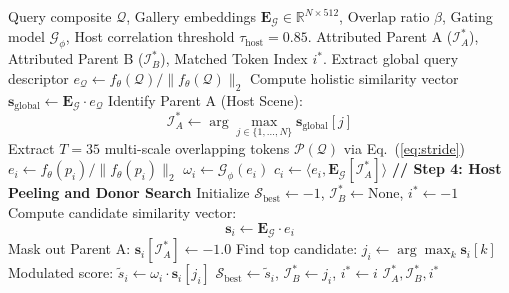 \documentclass[journal]{IEEEtran}
\begin{document}
\begin{algorithm}[t]
\caption{MOTA Multi-Source Lineage Attribution Algorithm}
\label{alg:mota}
\begin{algorithmic}[1]
\REQUIRE Query composite $\mathcal{Q}$, Gallery embeddings $\mathbf{E}_{\mathcal{G}} \in \mathbb{R}^{N \times 512}$, Overlap ratio $\beta$, Gating model $\mathcal{G}_\phi$, Host correlation threshold $\tau_{\text{host}} = 0.85$.
\ENSURE Attributed Parent A ($\mathcal{I}_A^*$), Attributed Parent B ($\mathcal{I}_B^*$), Matched Token Index $i^*$.
\STATE Extract global query descriptor $e_{\mathcal{Q}} \leftarrow f_\theta(\mathcal{Q}) / \|f_\theta(\mathcal{Q})\|_2$
\STATE Compute holistic similarity vector $\mathbf{s}_{\text{global}} \leftarrow \mathbf{E}_{\mathcal{G}} \cdot e_{\mathcal{Q}}$
\STATE Identify Parent A (Host Scene): 
$$\mathcal{I}_A^* \leftarrow \arg\max_{j \in \{1, \dots, N\}} \mathbf{s}_{\text{global}}[j]$$
\STATE Extract $T=35$ multi-scale overlapping tokens $\mathcal{P}(\mathcal{Q})$ via Eq.~(\ref{eq:stride})
    \STATE $e_i \leftarrow f_\theta(p_i) / \|f_\theta(p_i)\|_2$
    \STATE $\omega_i \leftarrow \mathcal{G}_\phi(e_i)$ 
    \STATE $c_i \leftarrow \langle e_i, \mathbf{E}_{\mathcal{G}}[\mathcal{I}_A^*] \rangle$ 
\ENDFOR
\STATE \textbf{// Step 4: Host Peeling and Donor Search}
\STATE Initialize $\mathcal{S}_{\text{best}} \leftarrow -1$, $\mathcal{I}_B^* \leftarrow \text{None}$, $i^* \leftarrow -1$
     
        \STATE Compute candidate similarity vector:
        $$\mathbf{s}_i \leftarrow \mathbf{E}_{\mathcal{G}} \cdot e_i$$
        \STATE Mask out Parent A: $\mathbf{s}_i[\mathcal{I}_A^*] \leftarrow -1.0$
        \STATE Find top candidate: $j_i \leftarrow \arg\max_k \mathbf{s}_i[k]$
        \STATE Modulated score: $\tilde{s}_i \leftarrow \omega_i \cdot \mathbf{s}_i[j_i]$
            \STATE $\mathcal{S}_{\text{best}} \leftarrow \tilde{s}_i$, $\mathcal{I}_B^* \leftarrow j_i$, $i^* \leftarrow i$
        \ENDIF
    \ENDIF
\ENDFOR
\RETURN $\mathcal{I}_A^*, \mathcal{I}_B^*, i^*$
\end{algorithmic}
\end{algorithm}
\end{document}
